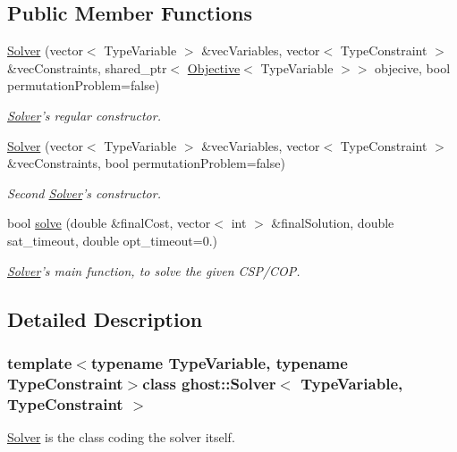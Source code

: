 \subsection*{Public Member Functions}
\begin{DoxyCompactItemize}
\item 
\hyperlink{classghost_1_1Solver_a63ed2beb29ac3ec61ffa56bf961a3e2b}{Solver} (vector$<$ Type\-Variable $>$ \&vec\-Variables, vector$<$ Type\-Constraint $>$ \&vec\-Constraints, shared\-\_\-ptr$<$ \hyperlink{classghost_1_1Objective}{Objective}$<$ Type\-Variable $>$$>$ objecive, bool permutation\-Problem=false)
\begin{DoxyCompactList}\small\item\em \hyperlink{classghost_1_1Solver}{Solver}'s regular constructor. \end{DoxyCompactList}\item 
\hyperlink{classghost_1_1Solver_aa72d319e0c91046d4b00ccb76588727c}{Solver} (vector$<$ Type\-Variable $>$ \&vec\-Variables, vector$<$ Type\-Constraint $>$ \&vec\-Constraints, bool permutation\-Problem=false)
\begin{DoxyCompactList}\small\item\em Second \hyperlink{classghost_1_1Solver}{Solver}'s constructor. \end{DoxyCompactList}\item 
bool \hyperlink{classghost_1_1Solver_ab2f3b79560cefbe8299583a40edad40e}{solve} (double \&final\-Cost, vector$<$ int $>$ \&final\-Solution, double sat\-\_\-timeout, double opt\-\_\-timeout=0.)
\begin{DoxyCompactList}\small\item\em \hyperlink{classghost_1_1Solver}{Solver}'s main function, to solve the given C\-S\-P/\-C\-O\-P. \end{DoxyCompactList}\end{DoxyCompactItemize}


\subsection{Detailed Description}
\subsubsection*{template$<$typename Type\-Variable, typename Type\-Constraint$>$class ghost\-::\-Solver$<$ Type\-Variable, Type\-Constraint $>$}

\hyperlink{classghost_1_1Solver}{Solver} is the class coding the solver itself. 

